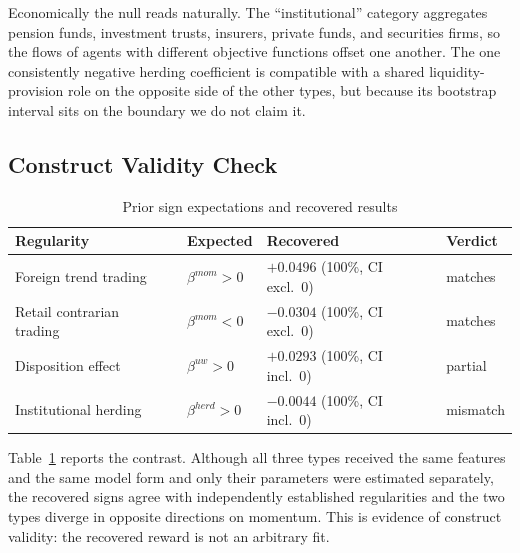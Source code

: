 Economically the null reads naturally. The ``institutional'' category aggregates
pension funds, investment trusts, insurers, private funds, and securities firms,
so the flows of agents with different objective functions offset one another.
The one consistently negative herding coefficient is compatible with a shared
liquidity-provision role on the opposite side of the other types, but because
its bootstrap interval sits on the boundary we do not claim it.

\subsection{Construct Validity Check}
\label{sec:construct}

\begin{table}[t]
  \caption{Prior sign expectations and recovered results}
  \label{tab:construct}
  \small
  \begin{tabular}{@{}>{\raggedright\arraybackslash}p{}
                  >{\raggedright\arraybackslash}p{}
                  >{\raggedright\arraybackslash}p{}
                  >{\raggedright\arraybackslash}p{}@{}}
    \toprule
    Regularity & Expected & Recovered & Verdict \\
    \midrule
    Foreign trend trading~\cite{grinblatt2000investment,choe1999foreign}
      & $\beta^{mom}>0$ & $+0.0496$ (100\%, CI excl.\ 0) & matches \\
    Retail contrarian trading~\cite{grinblatt2000investment,kaniel2008individual}
      & $\beta^{mom}<0$ & $-0.0304$ (100\%, CI excl.\ 0) & matches \\
    Disposition effect~\cite{shefrin1985disposition,odean1998investors}
      & $\beta^{uw}>0$ & $+0.0293$ (100\%, CI incl.\ 0) & partial \\
    Institutional herding~\cite{lakonishok1992impact}
      & $\beta^{herd}>0$ & $-0.0044$ (100\%, CI incl.\ 0) & mismatch \\
    \bottomrule
  \end{tabular}
\end{table}

Table~\ref{tab:construct} reports the contrast. Although all three types
received the same features and the same model form and only their parameters
were estimated separately, the recovered signs agree with independently
established regularities and the two types diverge in opposite directions on
momentum. This is evidence of construct validity: the recovered reward is not an
arbitrary fit.

